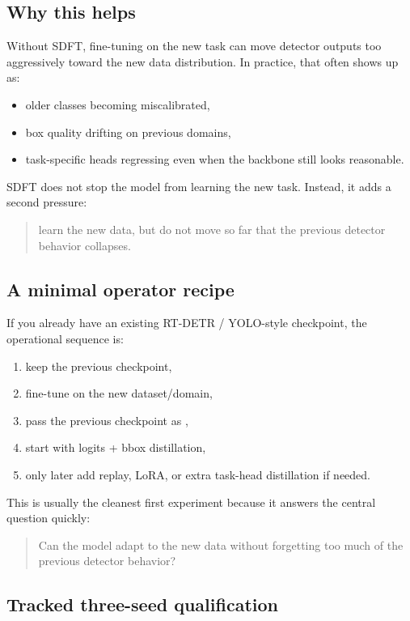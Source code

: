 \subsection{Why this helps}

Without SDFT, fine-tuning on the new task can move detector outputs too aggressively toward the new data distribution.
In practice, that often shows up as:
\begin{itemize}
  \item older classes becoming miscalibrated,
  \item box quality drifting on previous domains,
  \item task-specific heads regressing even when the backbone still looks reasonable.
\end{itemize}

SDFT does not stop the model from learning the new task.
Instead, it adds a second pressure:
\begin{quote}
learn the new data, but do not move so far that the previous detector behavior collapses.
\end{quote}

\subsection{A minimal operator recipe}

If you already have an existing RT-DETR / YOLO-style checkpoint, the operational sequence is:
\begin{enumerate}
  \item keep the previous checkpoint,
  \item fine-tune on the new dataset/domain,
  \item pass the previous checkpoint as ,
  \item start with logits + bbox distillation,
  \item only later add replay, LoRA, or extra task-head distillation if needed.
\end{enumerate}

This is usually the cleanest first experiment because it answers the central question quickly:
\begin{quote}
Can the model adapt to the new data without forgetting too much of the previous detector behavior?
\end{quote}

\subsection{Tracked three-seed qualification}

